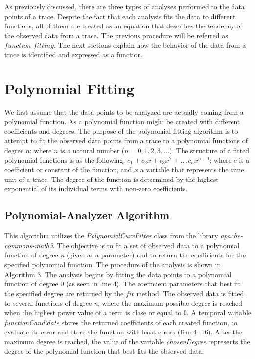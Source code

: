 As previously discussed, there are three types of analyses performed to the data points of a trace.
%
Despite the fact that each analysis fits the data to different functions, all of them are treated as an equation that describes the tendency of the observed data from a trace.
%
The previous procedure will be referred as $function$ $fitting$. The next sections explain how the behavior of the data from a trace is identified and expressed as a function. 

\section{Polynomial Fitting}

We first assume that the data points to be analyzed are actually coming from a polynomial function.
%
As a polynomial function might be created with different coefficients and degrees. 
%
The purpose of the polynomial fitting algorithm is to
attempt to fit the observed data points from a trace to a
polynomial functions of degree $n$; where $n$ is a natural number ($n={0,1,2,3,...}$).
%
The structure of a fitted polynomial functions is as the following: $c_{1} \pm c_{2}x \pm c_{3}x^{2} \pm .... c_{n}x^{n-1}$; where $c$ is a coefficient or constant of the function, and $x$ a variable that represents the time unit of a trace. 
%
The degree of the function is determined by the highest exponential of its individual terms with non-zero coefficients. 

\subsection{Polynomial-Analyzer Algorithm}

This algorithm utilizes the \textit{PolynomialCurvFitter} class from the library \textit{apache-commons-math3}. 
%
The objective is to fit a set of observed data to a polynomial function of degree \emph{n} (given as a parameter) and to return the coefficients for the specified polynomial function. 
%
The procedure of the analysis is shown in Algorithm 3.
\newline
\newline
The analysis begins by fitting the data points to a polynomial
function of degree 0 (as seen in line 4). 
%
The coefficient parameters that best fit the specified degree are returned by the $fit$ method. 
%
The observed data is fitted to several functions of degree \textit{n}, where the maximum possible degree is reached when the highest power value of a term is close or equal to 0.
%
A temporal variable \emph{functionCandidate} stores the returned coefficients of each created function, to evaluate its error and store the function with least errors
(line 4- 16).
%
After the maximum degree is reached, the value of the variable \emph{chosenDegree} represents the degree of the polynomial function that best fits the observed data.

